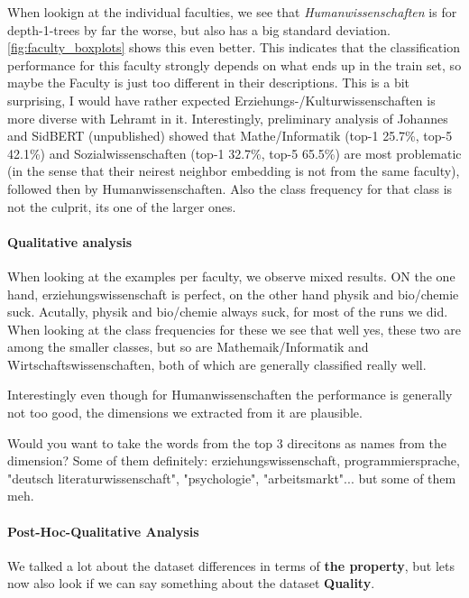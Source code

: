 When lookign at the individual faculties, we see that \textit{Humanwissenschaften} is for depth-1-trees by far the worse, but also has a big standard deviation. \autoref{fig:faculty_boxplots} shows this even better. This indicates that the classification performance for this faculty strongly depends on what ends up in the train set, so maybe the Faculty is just too different in their descriptions. This is a bit surprising, I would have rather expected Erziehungs-/Kulturwissenschaften is more diverse with Lehramt in it.  Interestingly, preliminary analysis of Johannes and SidBERT (unpublished) showed that Mathe/Informatik (top-1 25.7\%, top-5 42.1\%) and Sozialwissenschaften (top-1 32.7\%, top-5 65.5\%) are most problematic (in the sense that their neirest neighbor embedding is not from the same faculty), followed then by Humanwissenschaften. Also the class frequency for that class is not the culprit, its one of the larger ones.

\paragraph{Qualitative analysis}

When looking at the examples per faculty, we observe mixed results. ON the one hand, erziehungswissenschaft is perfect, on the other hand physik and bio/chemie suck. Acutally, physik and bio/chemie always suck, for most of the runs we did. When looking at the class frequencies for these we see that well yes, these two are among the smaller classes, but so are Mathemaik/Informatik and Wirtschaftswissenschaften, both of which are generally classified really well.

Interestingly even though for Humanwissenschaften the performance is generally not too good, the dimensions we extracted from it are plausible.

Would you want to take the words from the top 3 direcitons as names from the dimension? Some of them definitely: erziehungswissenschaft, programmiersprache, "deutsch literaturwissenschaft", "psychologie", "arbeitsmarkt"... but some of them meh.


\paragraph{Post-Hoc-Qualitative Analysis}
\label{sec:duplicate_maps}


We talked a lot about the dataset differences in terms of \textbf{the property}, but lets now also look if we can say something about the dataset \textbf{Quality}.

